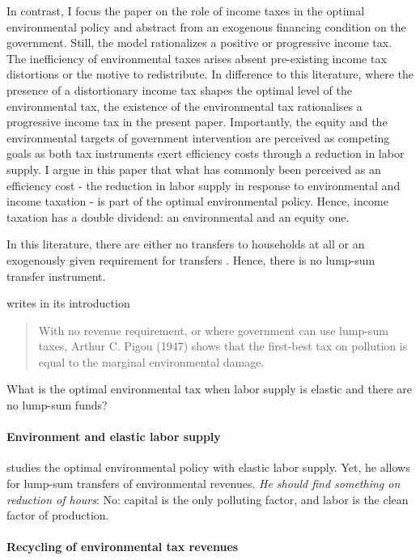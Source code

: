 In contrast, I focus the paper on the role of income taxes in the optimal environmental policy and abstract from an exogenous financing condition on the government. Still, the model rationalizes a positive or progressive income tax.
 The inefficiency of environmental taxes arises absent pre-existing income tax distortions or the motive to redistribute.
In difference to this literature, where the presence of a distortionary income tax shapes the optimal level of the environmental tax, the existence of the environmental tax rationalises a progressive income tax in the present paper.
Importantly, the equity and the environmental targets of government intervention are perceived as competing goals as both tax instruments exert efficiency costs through a reduction in labor supply. 
I argue in this paper that what has commonly been perceived as an efficiency cost -  the reduction in labor supply in response to environmental and income taxation - is part of the optimal environmental policy. Hence, income taxation has a double dividend: an environmental and an equity one.  

In this literature, there are either no transfers to households at all \citep{Bovenberg2002EnvironmentalRegulation, LansBovenberg1994EnvironmentalTaxation} or an exogenously given requirement for transfers \citep{Barrage2019OptimalPolicy}. Hence, there is no lump-sum transfer instrument.

\citep{Fullerton1997EnvironmentalComment} writes in its introduction 
\begin{quote}
	With no revenue requirement, or where government can use lump-sum taxes, Arthur C. Pigou (1947) shows that the first-best tax on pollution is equal to the marginal environmental damage.
\end{quote}
\ar What is the optimal environmental tax when labor supply is elastic and there are no lump-sum funds?
\paragraph{Environment and elastic labor supply}
\cite{Oueslati2002EnvironmentalSupply} studies the optimal environmental policy with elastic labor supply. Yet, he allows for lump-sum transfers of environmental revenues. \textit{He should find something on reduction of hours}: No: capital is the only polluting factor, and labor is the clean factor of production.
\paragraph{Recycling of environmental tax revenues}

